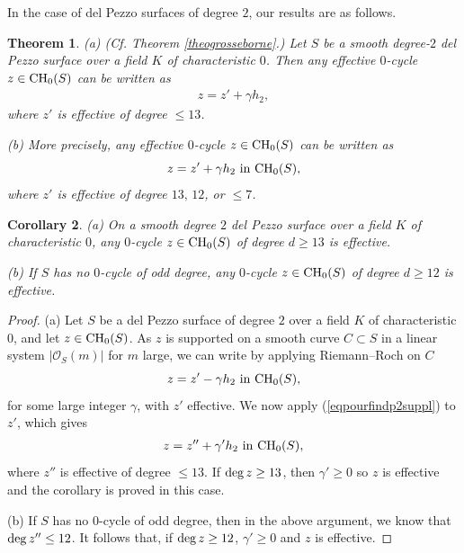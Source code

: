 \documentclass[10pt]{article}
\newtheorem{theo}{Theorem}[section]
\newtheorem{coro}[theo]{Corollary}
\begin{document}
In the case of del Pezzo surfaces of degree $2$, our results are as follows.



\begin{theo} \label{theo2surfdelPsanspoint} (a) (Cf. Theorem \ref{theogrosseborne}.)  Let   $S$ be a  smooth degree-$2$ del Pezzo surface over  a field $K$ of characteristic $0$. Then  any  effective $0$-cycle $z\in{\rm CH}_0(S)$ can be written as
 \begin{eqnarray}\label{eqformcycledp2} z= z'+\gamma h_2,
 \end{eqnarray}
 where $z'$ is effective of degree $\leq 13$.

 (b) More precisely,  any effective $0$-cycle $z\in {\rm CH}_0(S)$ can be written as
 $$z=z'+\gamma h_2\,\,{\rm in}\,\,{\rm CH}_0(S),$$
 where $z'$ is effective of degree $13, \,12$, or $\leq 7$.
 \end{theo}



 \begin{coro} \label{coroeffdp2} (a) On a smooth degree $2$ del Pezzo surface over a  field $K$ of characteristic $0$, any $0$-cycle $z\in {\rm CH}_0(S)$ of degree $d\geq 13$ is effective.

 (b) If $S$ has no  $0$-cycle of odd degree, any $0$-cycle $z\in {\rm CH}_0(S)$ of degree $d\geq 12$ is effective.
 \end{coro}
 \begin{proof} (a) Let $S$ be a del Pezzo surface of degree $2$ over a field $K$ of characteristic $0$, and let $z\in {\rm CH}_0(S)$. As $z$ is supported on a smooth curve $C\subset S$ in a linear system $|\mathcal{O}_S(m)|$ for $m$ large, we can  write by applying Riemann--Roch on $C$
  $$z=z'  -\gamma h_2\,\,{\rm in}\,\,{\rm CH}_0(S),$$ for some large integer $\gamma$, with $z'$  effective. We now apply (\ref{eqpourfindp2suppl}) to $z'$, which gives
\begin{eqnarray}\label{eqpourzdedermin} z=  z''+\gamma' h_2\,\,{\rm in}\,\,{\rm CH}_0(S),\end{eqnarray}
where $z''$ is effective of degree $\leq 13$.
If ${\rm deg}\,z\geq 13$, then $\gamma'\geq 0$ so $z$ is effective and the corollary is proved in this case.

(b) If $S$ has no   $0$-cycle of odd degree, then in the above argument, we know that ${\rm deg}\,z''\leq 12$.
It follows that, if  ${\rm deg}\,z\geq 12$,  $\gamma'\geq 0$ and $z$ is effective.
\end{proof}
\end{document}
